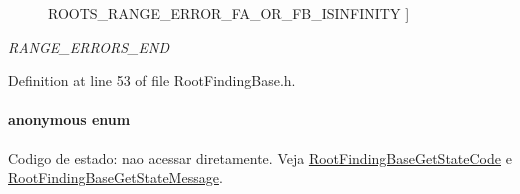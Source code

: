 \begin{Desc}
\begin{description}
{\hypertarget{structRootFindingBase_63c3383c7a423657e53c74135d7fcc1a9b12d4346a0a0e6a2770fa91ebbb2095}{
ROOTS\_\-RANGE\_\-ERROR\_\-FA\_\-OR\_\-FB\_\-ISINFINITY}
\label{structRootFindingBase_63c3383c7a423657e53c74135d7fcc1a9b12d4346a0a0e6a2770fa91ebbb2095}
}]\item[{\em 
\hypertarget{structRootFindingBase_63c3383c7a423657e53c74135d7fcc1aa0557e4a6d95a4ba4414dea6967caebd}{
RANGE\_\-ERRORS\_\-END}
\label{structRootFindingBase_63c3383c7a423657e53c74135d7fcc1aa0557e4a6d95a4ba4414dea6967caebd}
}]\end{description}
\end{Desc}



Definition at line 53 of file RootFindingBase.h.\hypertarget{structRootFindingBase_4b7656f2b255891252a8139d4e31d5cb}{
\paragraph["@1]{\setlength{\rightskip}{0pt plus 5cm}anonymous enum}\hfill}
\label{structRootFindingBase_4b7656f2b255891252a8139d4e31d5cb}


Codigo de estado: nao acessar diretamente. Veja \hyperlink{group____roots_g1712b9a29b6e6b15df2195319d5f5d70}{RootFindingBaseGetStateCode} e \hyperlink{group____roots_ga2434bfeb9592ff54df8601cd1a9a04d}{RootFindingBaseGetStateMessage}. 

